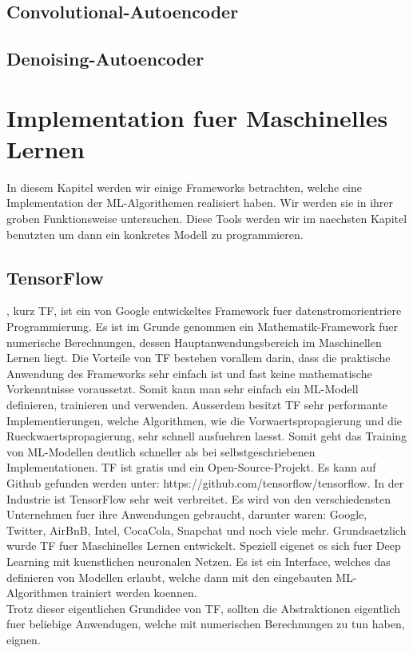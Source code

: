 \section{Convolutional-Autoencoder}

\section{Denoising-Autoencoder}



\chapter{Implementation fuer Maschinelles Lernen}
In diesem Kapitel werden wir einige Frameworks betrachten, welche eine
Implementation der ML-Algorithemen realisiert haben. Wir werden sie in ihrer
groben Funktionsweise untersuchen. Diese Tools werden wir im
naechsten Kapitel benutzten um dann ein konkretes Modell zu programmieren.

\section{TensorFlow}
, kurz TF, ist ein von Google entwickeltes Framework fuer
datenstromorientriere Programmierung. Es ist im Grunde genommen ein
Mathematik-Framework fuer numerische Berechnungen, dessen Hauptanwendungsbereich im Maschinellen Lernen
liegt. Die Vorteile von TF bestehen vorallem darin, dass die praktische
Anwendung des Frameworks sehr
einfach ist und fast keine mathematische Vorkenntnisse voraussetzt. Somit kann
man sehr einfach ein ML-Modell definieren, trainieren und verwenden. Ausserdem
besitzt TF sehr performante Implementierungen, welche Algorithmen, wie die
Vorwaertspropagierung und die Rueckwaertspropagierung, sehr schnell ausfuehren
laesst. Somit geht das Training von ML-Modellen deutlich schneller als bei
selbstgeschriebenen Implementationen.
TF ist gratis und ein Open-Source-Projekt. Es kann auf Github gefunden werden
unter: https://github.com/tensorflow/tensorflow.
\para{}
In der Industrie ist TensorFlow sehr weit verbreitet. Es wird von den
verschiedensten Unternehmen fuer ihre Anwendungen gebraucht, darunter waren:
Google, Twitter, AirBnB, Intel, CocaCola, Snapchat und noch viele mehr.
\para{}
Grundsaetzlich wurde TF fuer Maschinelles Lernen entwickelt. Speziell eigenet es
sich fuer Deep Learning mit kuenstlichen neuronalen Netzen. Es ist ein
Interface, welches das definieren von Modellen erlaubt, welche dann mit den
eingebauten ML-Algorithmen trainiert werden koennen. \\
Trotz dieser eigentlichen Grundidee von TF, sollten die Abstraktionen eigentlich
fuer beliebige Anwendugen, welche mit numerischen Berechnungen zu tun haben,
eignen.

